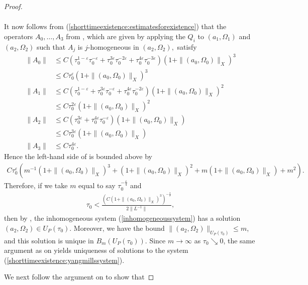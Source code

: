 \documentclass[12pt]{amsart}
\renewcommand{\1}{{\mathbf 1}}
\theoremstyle{others}
\numberwithin{equation}{section}
\begin{document}
\begin{proof}
\begin{align*}
\end{align*}\par 
It now follows from (\ref{shorttimeexistence:estimatesforexistence}) that the operators \(A_0, \dots, A_3\) from \cite[pg. 19]{radethesis}, which are given by applying the $Q_i$ to $(a_1, \Omega_1)$ and $(a_2, \Omega_2)$ such that $A_j$ is $j$-homogeneous in $(a_2, \Omega_2),$ satisfy
\begin{align*}
    \|A_0\| &\leq C(\tau_0^{1-\varepsilon}\tau_0^{-\varepsilon} + \tau_0^{3\varepsilon}\tau_0^{-2\varepsilon} + \tau_0^{4\varepsilon}\tau_0^{-3\varepsilon})(1 + \|(a_0, \Omega_0)\|_X)^3 \\
    &\leq C\tau_0^\varepsilon(1 + \|(a_0, \Omega_0)\|_X)^3 \\
    \|A_1\|  &\leq C(\tau_0^{1-\varepsilon} + \tau_0^{3\varepsilon}\tau_0^{-\varepsilon} + \tau_0^{4\varepsilon}\tau_0^{-2\varepsilon})(1 + \|(a_0, \Omega_0)\|_X)^2 \\
    &\leq C\tau_0^{2\varepsilon}(1 + \|(a_0, \Omega_0)\|_X)^2 \\
    \|A_2\| &\leq C(\tau_0^{3\varepsilon} + \tau_0^{4\varepsilon}\tau_0^{-\varepsilon})(1 + \|(a_0, \Omega_0)\|_X) \\
    &\leq C \tau_0^{3\varepsilon}(1 + \|(a_0, \Omega_0)\|_X) \\
    \|A_3\| &\leq C\tau_0^{4\varepsilon}.
\end{align*} Hence the left-hand side of \cite[(24), pg. 18]{radethesis} is bounded above by
\begin{align*}
     C\tau_0^{\varepsilon}(m^{-1}(1 + \|(a_0, \Omega_0)\|_X)^3 + (1+ \|(a_0, \Omega_0)\|_X)^2 + m(1 + \|(a_0, \Omega_0)\|_X) + m^2).
\end{align*} Therefore, if we take \(m\) equal to say \(\tau_0^{-\frac{\varepsilon}{4}}\) and
\begin{align*}
    \tau_0 < \frac{(C(1 + \|(a_0, \Omega_0)\|_X)^3)^{-\frac{2}{\varepsilon}}}{2\|L^{-1}\|},
\end{align*} then by \cite[Lemma B.5]{radethesis}, the inhomogeneous system (\ref{inhomogeneoussystem}) has a solution \((a_2, \Omega_2) \in U_P(\tau_0)\). Moreover, we have the bound \(\|(a_2, \Omega_2)\|_{U_P(\tau_0)} \leq m\), and this solution is unique in \(B_m(U_P(\tau_0))\). Since \(m \to \infty\) as \(\tau_0 \searrow 0\), the same argument as on \cite[pg. 21]{radethesis} yields uniqueness of solutions to the system (\ref{shorttimeexistence:yangmillssystem}). \par We next follow the argument on \cite[pg. 20-21]{radethesis} to show that

\end{proof}
\end{document}
